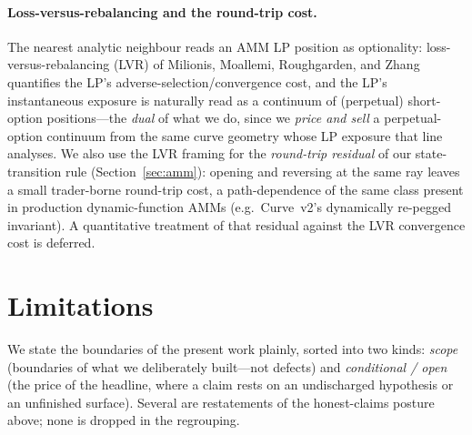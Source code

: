 \documentclass[11pt]{article}
\begin{document}
\paragraph{Loss-versus-rebalancing and the round-trip cost.}
The nearest analytic neighbour reads an AMM LP position as
optionality: loss-versus-rebalancing (LVR) of
Milionis, Moallemi, Roughgarden, and Zhang~\cite{lvr} quantifies the LP's
adverse-selection/convergence cost, and the LP's instantaneous exposure is
naturally read as a continuum of (perpetual) short-option positions---the
\emph{dual} of what we do, since we \emph{price and sell} a perpetual-option
continuum from the same curve geometry whose LP exposure that line analyses. We
also use the LVR framing for the \emph{round-trip residual} of our state-transition
rule (Section~\ref{sec:amm}): opening and reversing at the same ray leaves a small
trader-borne round-trip cost, a path-dependence of the same class present in
production dynamic-function AMMs (e.g.\ Curve~v2's dynamically re-pegged
invariant). A quantitative treatment of that residual against the LVR convergence
cost is deferred.

\section{Limitations}\label{sec:limitations}

We state the boundaries of the present work plainly, sorted into two kinds:
\emph{scope} (boundaries of what we deliberately built---not defects) and
\emph{conditional / open} (the price of the headline, where a claim rests on an
undischarged hypothesis or an unfinished surface). Several are restatements of the
honest-claims posture above; none is dropped in the regrouping.
\end{document}
